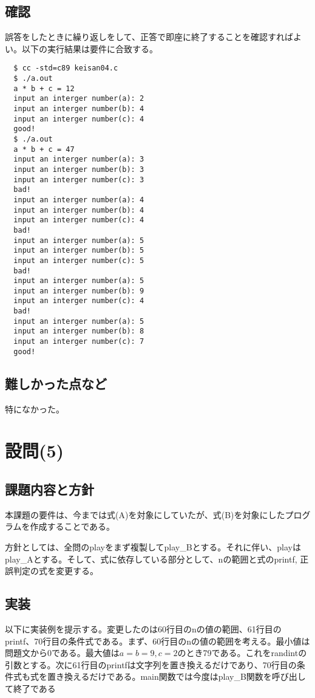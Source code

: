\documentclass[dvipdfmx,12pt,a4j]{jarticle}
\begin{document}
\subsection{確認}
誤答をしたときに繰り返しをして、正答で即座に終了することを確認すればよい。以下の実行結果は要件に合致する。
\begin{verbatim}
  $ cc -std=c89 keisan04.c
  $ ./a.out
  a * b + c = 12
  input an interger number(a): 2
  input an interger number(b): 4
  input an interger number(c): 4
  good!
  $ ./a.out
  a * b + c = 47
  input an interger number(a): 3
  input an interger number(b): 3
  input an interger number(c): 3
  bad!
  input an interger number(a): 4
  input an interger number(b): 4
  input an interger number(c): 4
  bad!
  input an interger number(a): 5
  input an interger number(b): 5
  input an interger number(c): 5
  bad!
  input an interger number(a): 5
  input an interger number(b): 9
  input an interger number(c): 4
  bad!
  input an interger number(a): 5
  input an interger number(b): 8
  input an interger number(c): 7
  good!
\end{verbatim}

\subsection{難しかった点など}
特になかった。

\section{設問(5)}
\subsection{課題内容と方針}
本課題の要件は、今までは式(A)を対象にしていたが、式(B)を対象にしたプログラムを作成することである。

方針としては、全問のplayをまず複製してplay\_Bとする。それに伴い、playはplay\_Aとする。そして、式に依存している部分として、nの範囲と式のprintf, 正誤判定の式を変更する。

\subsection{実装}
以下に実装例を提示する。変更したのは60行目のnの値の範囲、61行目のprintf、70行目の条件式である。まず、60行目のnの値の範囲を考える。最小値は問題文から0である。最大値は$a=b=9, c=2$のとき79である。これをrandintの引数とする。次に61行目のprintfは文字列を置き換えるだけであり、70行目の条件式も式を置き換えるだけである。main関数では今度はplay\_B関数を呼び出して終了である

\end{document}
